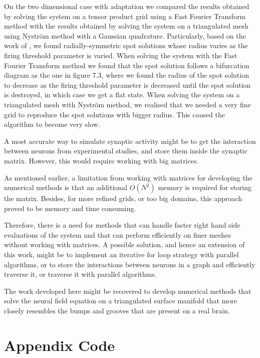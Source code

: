 \documentclass{uonmathreport}
\begin{document}
On the two dimensional case with adaptation we compared the results obtained by solving the system on a tensor product grid using a Fast Fourier Transform method with the results obtained by solving the system on a triangulated mesh using Nystr\"om method with a Gaussian quadrature. Particularly, based on the work of \cite{coombes2014spots}, we found radially-symmetric spot solutions whose radius varies as the firing threshold parameter is varied. When solving the system with the Fast Fourier Transform method we found that the spot solution follows a bifurcation diagram as the one in \cite{coombes2014spots} figure 7.3, where we found the radius of the spot solution to decrease as the firing threshold parameter is decreased until the spot solution is destroyed, in which case we get a flat state. When solving the system on a triangulated mesh with Nystr\"om method, we realised that we needed a very fine grid to reproduce the spot solutions with bigger radius. This caused the algorithm to become very slow.

A most accurate way to simulate synaptic activity might be to get the interaction between neurons from experimental studies, and store them inside the synaptic matrix. However, this would require working with big matrices.

As mentioned earlier, a limitation from working with matrices for developing the numerical methods is that an additional $O(N^2)$ memory is required for storing the matrix. Besides, for more refined grids, or too big domains, this approach proved to be memory and time consuming.

Therefore, there is a need for methods that can handle faster right hand side evaluations of the system and that can perform efficiently on finer meshes without working with matrices. A possible solution, and hence an extension of this work, might be to implement an iterative for loop strategy with parallel algorithms, or to store the interactions between neurons in a graph and efficiently traverse it, or traverse it with parallel algorithms.

The work developed here might be recovered to develop numerical methods that solve the neural field equation on a triangulated surface manifold that more closely resembles the bumps and grooves that are present on a real brain.

\newpage

\appendix

\section{Appendix Code} \label{app:code}
\end{document}
